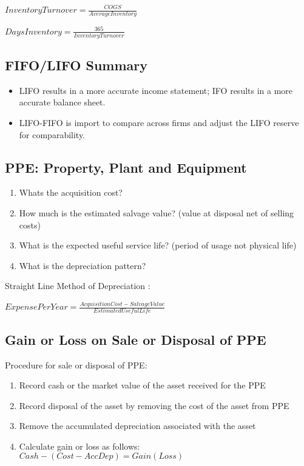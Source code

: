 $InventoryTurnover = \frac{COGS}{AverageInventory}$ \

$DaysInventory = \frac{365}{InventoryTurnover}$ \

\subsection*{FIFO/LIFO Summary}

\begin{itemize}
	\item LIFO results in a more accurate income statement; IFO results in a more accurate balance sheet.
	\item LIFO-FIFO is import to compare across firms and adjust the LIFO reserve for comparability.
\end{itemize}


\subsection*{PPE: Property, Plant and Equipment}

\begin{enumerate}
	\item Whats the acquisition cost?
	\item How much is the estimated salvage value? (value at disposal net of selling costs)
	\item What is the expected useful service life? (period of usage not physical life)
	\item What is the depreciation pattern?
\end{enumerate}
	
Straight Line Method of Depreciation : 

$ExpensePerYear = \frac{AcquisitionCost - SalvageValue}{EstimatedUsefulLife}$ \


\subsection*{Gain or Loss on Sale or Disposal of PPE}
Procedure for sale or disposal of PPE:
\begin{enumerate}
	\item Record cash or the market value of the asset received for the PPE
	\item Record disposal of the asset by removing the cost of the asset from PPE
	\item Remove the accumulated depreciation associated with the asset
	\item Calculate gain or loss as follows: \\  
	$ Cash - (Cost - AccDep) = Gain (Loss) $
\end{enumerate}


